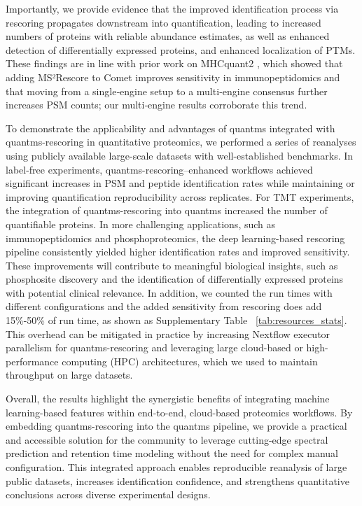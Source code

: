 \documentclass[12pt]{article}
\begin{document}
Importantly, we provide evidence that the improved identification process via rescoring propagates downstream into quantification, leading to increased numbers of proteins with reliable abundance estimates, as well as enhanced detection of differentially expressed proteins, and enhanced localization of PTMs. These findings are in line with prior work on MHCquant2 \cite{scheid2025mhcquant2}, which showed that adding MS²Rescore to Comet improves sensitivity in immunopeptidomics and that moving from a single‑engine setup to a multi‑engine consensus further increases PSM counts; our multi‑engine results corroborate this trend.

To demonstrate the applicability and advantages of quantms integrated with quantms-rescoring in quantitative proteomics, we performed a series of reanalyses using publicly available large-scale datasets with well-established benchmarks. In label-free experiments, quantms-rescoring–enhanced workflows achieved significant increases in PSM and peptide identification rates while maintaining or improving quantification reproducibility across replicates. For TMT experiments, the integration of quantms-rescoring into quantms increased the number of quantifiable proteins. In more challenging applications, such as immunopeptidomics and phosphoproteomics, the deep learning-based rescoring pipeline consistently yielded higher identification rates and improved sensitivity.
These improvements will contribute to meaningful biological insights, such as phosphosite discovery and the identification of differentially expressed proteins with potential clinical relevance. In addition, we counted the run times with different configurations and the added sensitivity from rescoring does add 15\%-50\% of run time, as shown as Supplementary Table ~\ref{tab:resources_stats}. This overhead can be mitigated in practice by increasing Nextflow executor parallelism for quantms-rescoring and leveraging large cloud-based or high-performance computing (HPC) architectures, which we used to maintain throughput on large datasets.

Overall, the results highlight the synergistic benefits of integrating machine learning-based features within end-to-end, cloud-based proteomics workflows. By embedding quantms-rescoring into the quantms pipeline, we provide a practical and accessible solution for the community to leverage cutting-edge spectral prediction and retention time modeling without the need for complex manual configuration. This integrated approach enables reproducible reanalysis of large public datasets, increases identification confidence, and strengthens quantitative conclusions across diverse experimental designs.
\end{document}
